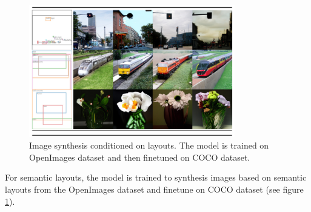 \begin{figure}
    \centering
    \includegraphics[width=0.8\textwidth]{images/diffusion_models/stable_diffusion/experiments_3.png}
    \caption{Image synthesis conditioned on layouts. The model is trained on OpenImages dataset and then finetuned on COCO dataset.}
    \label{fig:stable_diffusion_experiments_semantic_layouts}
\end{figure}

For semantic layouts, the model is trained to synthesis images based on semantic layouts from the OpenImages dataset and finetune on COCO dataset (see figure \ref{fig:stable_diffusion_experiments_semantic_layouts}).




